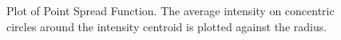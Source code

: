 \begin{figure}[h]
  \caption{Plot of Point Spread Function. The average intensity on concentric circles around the intensity centroid is plotted against the radius.}
  \label{plot}
\end{figure}

